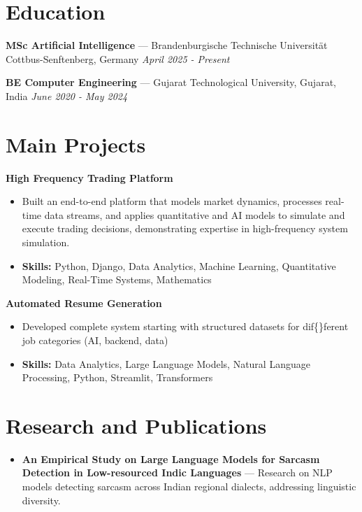 \documentclass[a4paper,10pt]{article}
\begin{document}
\section*{Education}
\textbf{MSc Artificial Intelligence} — Brandenburgische Technische Universität Cottbus-Senftenberg, Germany \hfill \textit{April 2025 - Present}\par
\vspace{1.5pt}
\textbf{BE Computer Engineering} — Gujarat Technological University, Gujarat, India \hfill \textit{June 2020 - May 2024}\par

\section*{Main Projects}
\textbf{High Frequency Trading Platform}\par
\vspace{1pt}
\begin{itemize}
  \item Built an end-to-end platform that models market dynamics, processes real-time data streams, and applies quantitative and AI models to simulate and execute trading decisions, demonstrating expertise in high-frequency system simulation.
  \item \textbf{Skills:} Python, Django, Data Analytics, Machine Learning, Quantitative Modeling, Real-Time Systems, Mathematics
\end{itemize}
\vspace{3pt}
\textbf{Automated Resume Generation}\par
\vspace{1pt}
\begin{itemize}
  \item Developed complete system starting with structured datasets for dif\{\}ferent job categories (AI, backend, data)
  \item \textbf{Skills:} Data Analytics, Large Language Models, Natural Language Processing, Python, Streamlit, Transformers
\end{itemize}

\section*{Research and Publications}
\begin{itemize}
\item \textbf{An Empirical Study on Large Language Models for Sarcasm Detection in Low-resourced Indic Languages} — Research on NLP models detecting sarcasm across Indian regional dialects, addressing linguistic diversity.
\end{itemize}
\end{document}
